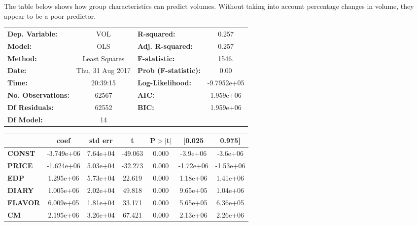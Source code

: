 \documentclass{article}
\begin{document}
  The table below shows how group characteristics can predict volumes. Without taking into account percentage changes in volume, they appear to be a poor predictor.

\begin{center}
\begin{tabular}{lclc}
\toprule
\textbf{Dep. Variable:}    &        VOL         & \textbf{  R-squared:         } &      0.257   \\
\textbf{Model:}            &       OLS        & \textbf{  Adj. R-squared:    } &      0.257   \\
\textbf{Method:}           &  Least Squares   & \textbf{  F-statistic:       } &      1546.   \\
\textbf{Date:}             & Thu, 31 Aug 2017 & \textbf{  Prob (F-statistic):} &      0.00    \\
\textbf{Time:}             &     20:39:15     & \textbf{  Log-Likelihood:    } & -9.7952e+05  \\
\textbf{No. Observations:} &       62567      & \textbf{  AIC:               } &  1.959e+06   \\
\textbf{Df Residuals:}     &       62552      & \textbf{  BIC:               } &  1.959e+06   \\
\textbf{Df Model:}         &          14      & \textbf{                     } &              \\
\bottomrule
\end{tabular}
\begin{tabular}{lcccccc}
               & \textbf{coef} & \textbf{std err} & \textbf{t} & \textbf{P$>$$|$t$|$} & \textbf{[0.025} & \textbf{0.975]}  \\
\midrule
\textbf{CONST} &   -3.749e+06  &     7.64e+04     &   -49.063  &         0.000        &     -3.9e+06    &     -3.6e+06     \\
\textbf{PRICE}    &   -1.624e+06  &     5.03e+04     &   -32.273  &         0.000        &    -1.72e+06    &    -1.53e+06     \\
\textbf{EDP}    &    1.295e+06  &     5.73e+04     &    22.619  &         0.000        &     1.18e+06    &     1.41e+06     \\
\textbf{DIARY}    &    1.005e+06  &     2.02e+04     &    49.818  &         0.000        &     9.65e+05    &     1.04e+06     \\
\textbf{FLAVOR}    &    6.009e+05  &     1.81e+04     &    33.171  &         0.000        &     5.65e+05    &     6.36e+05     \\
\textbf{CM}    &    2.195e+06  &     3.26e+04     &    67.421  &         0.000        &     2.13e+06    &     2.26e+06     \\

\end{tabular}
\end{center}
\end{document}
